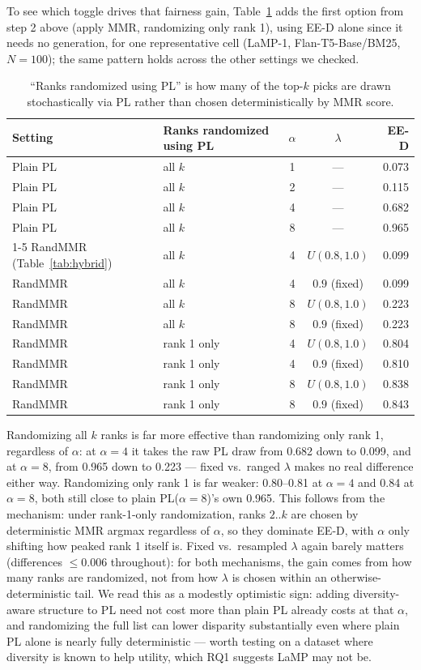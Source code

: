 \documentclass[10pt,twocolumn]{article}
\begin{document}
To see which toggle drives that fairness gain, Table~\ref{tab:toggle} adds the
first option from step 2 above (apply MMR, randomizing only rank 1), using EE-D
alone since it needs no generation, for one representative cell (LaMP-1,
Flan-T5-Base/BM25, $N{=}100$); the same pattern holds across the other
settings we checked.

\begin{table}[t]
\centering
\scriptsize
\setlength{\tabcolsep}{4pt}
\caption{``Ranks randomized using PL'' is how many of the top-$k$ picks are
drawn stochastically via PL rather than chosen deterministically by MMR
score.}
\label{tab:toggle}
\begin{tabular}{@{}ll cc r@{}}
\toprule
Setting & Ranks randomized using PL & $\alpha$ & $\lambda$ & EE-D \\
\midrule
Plain PL & all $k$ & 1 & --- & 0.073 \\
Plain PL & all $k$ & 2 & --- & 0.115 \\
Plain PL & all $k$ & 4 & --- & 0.682 \\
Plain PL & all $k$ & 8 & --- & 0.965 \\
\cmidrule(lr){1-5}
RandMMR (Table~\ref{tab:hybrid}) & all $k$ & 4 & $U(0.8,1.0)$ & 0.099 \\
RandMMR & all $k$ & 4 & $0.9$ (fixed) & 0.099 \\
RandMMR & all $k$ & 8 & $U(0.8,1.0)$ & 0.223 \\
RandMMR & all $k$ & 8 & $0.9$ (fixed) & 0.223 \\
RandMMR & rank 1 only & 4 & $U(0.8,1.0)$ & 0.804 \\
RandMMR & rank 1 only & 4 & $0.9$ (fixed) & 0.810 \\
RandMMR & rank 1 only & 8 & $U(0.8,1.0)$ & 0.838 \\
RandMMR & rank 1 only & 8 & $0.9$ (fixed) & 0.843 \\
\bottomrule
\end{tabular}
\end{table}

Randomizing all $k$ ranks is far more effective than randomizing only rank 1,
regardless of $\alpha$: at $\alpha{=}4$ it takes the raw PL draw from 0.682
down to 0.099, and at $\alpha{=}8$, from 0.965 down to 0.223 --- fixed vs.\
ranged $\lambda$ makes no real difference either way. Randomizing only rank 1
is far weaker: 0.80--0.81 at $\alpha{=}4$ and 0.84 at $\alpha{=}8$, both still
close to plain PL($\alpha{=}8$)'s own 0.965. This follows from the mechanism:
under rank-1-only randomization, ranks $2..k$ are chosen by deterministic MMR
argmax regardless of $\alpha$, so they dominate EE-D, with $\alpha$ only
shifting how peaked rank 1 itself is. Fixed vs.\ resampled $\lambda$ again
barely matters (differences $\leq$0.006 throughout): for both mechanisms, the
gain comes from how many ranks are randomized, not from how $\lambda$ is
chosen within an otherwise-deterministic tail. We read this as a modestly
optimistic sign: adding diversity-aware structure to PL need not cost more
than plain PL already costs at that $\alpha$, and randomizing the full list
can lower disparity substantially even where plain PL alone is nearly fully
deterministic --- worth testing on a dataset where diversity is known to help
utility, which RQ1 suggests LaMP may not be.
\end{document}
